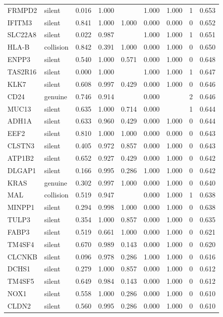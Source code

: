 \begin{longtable}{llrrrrrrr}
FRMPD2 & silent & 0.016 & 1.000 &  & 1.000 & 1.000 & 1 & 0.653\\
IFITM3 & silent & 0.841 & 1.000 & 1.000 & 0.000 & 0.000 & 0 & 0.652\\
SLC22A8 & silent & 0.022 & 0.987 &  & 1.000 & 1.000 & 1 & 0.651\\
HLA-B & collision & 0.842 & 0.391 & 1.000 & 0.000 & 1.000 & 0 & 0.650\\
ENPP3 & silent & 0.540 & 1.000 & 0.571 & 0.000 & 1.000 & 0 & 0.648\\
TAS2R16 & silent & 0.000 & 1.000 &  & 1.000 & 1.000 & 1 & 0.647\\
KLK7 & silent & 0.608 & 0.997 & 0.429 & 0.000 & 1.000 & 0 & 0.646\\
CD24 & genuine & 0.746 & 0.914 &  & 0.000 &  & 2 & 0.646\\
MUC13 & silent & 0.635 & 1.000 & 0.714 & 0.000 &  & 1 & 0.644\\
ADH1A & silent & 0.633 & 0.960 & 0.429 & 0.000 & 1.000 & 0 & 0.644\\
EEF2 & silent & 0.810 & 1.000 & 1.000 & 0.000 & 0.000 & 0 & 0.643\\
CLSTN3 & silent & 0.405 & 0.972 & 0.857 & 0.000 & 1.000 & 0 & 0.643\\
ATP1B2 & silent & 0.652 & 0.927 & 0.429 & 0.000 & 1.000 & 0 & 0.642\\
DLGAP1 & silent & 0.166 & 0.995 & 0.286 & 1.000 & 1.000 & 0 & 0.642\\
KRAS & genuine & 0.302 & 0.997 & 1.000 & 0.000 & 1.000 & 0 & 0.640\\
MAL & collision & 0.519 & 0.947 &  & 0.000 & 1.000 & 1 & 0.638\\
MINPP1 & silent & 0.294 & 0.998 & 1.000 & 0.000 & 1.000 & 0 & 0.638\\
TULP3 & silent & 0.354 & 1.000 & 0.857 & 0.000 & 1.000 & 0 & 0.635\\
FABP3 & silent & 0.519 & 0.661 & 1.000 & 0.000 & 1.000 & 0 & 0.621\\
TM4SF4 & silent & 0.670 & 0.989 & 0.143 & 0.000 & 1.000 & 0 & 0.620\\
CLCNKB & silent & 0.096 & 0.978 & 0.286 & 1.000 & 1.000 & 0 & 0.616\\
DCHS1 & silent & 0.279 & 1.000 & 0.857 & 0.000 & 1.000 & 0 & 0.612\\
TM4SF5 & silent & 0.649 & 0.984 & 0.143 & 0.000 & 1.000 & 0 & 0.612\\
NOX1 & silent & 0.558 & 1.000 & 0.286 & 0.000 & 1.000 & 0 & 0.610\\
CLDN2 & silent & 0.560 & 0.995 & 0.286 & 0.000 & 1.000 & 0 & 0.610\\

\end{longtable}
